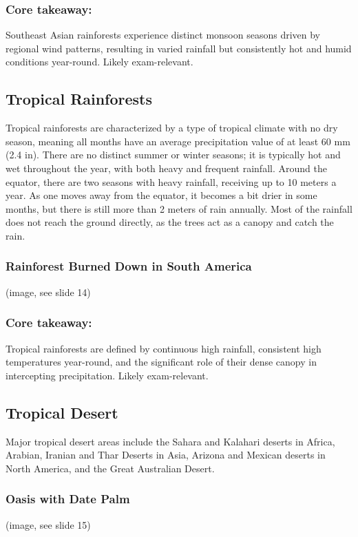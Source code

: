 \subsubsection*{Core takeaway:} 
Southeast Asian rainforests experience distinct monsoon seasons driven by regional wind patterns, resulting in varied rainfall but consistently hot and humid conditions year-round. Likely exam-relevant.


\subsection{Tropical Rainforests} 
Tropical rainforests are characterized by a type of tropical climate with no dry season, meaning all months have an average precipitation value of at least 60 mm (2.4 in). There are no distinct summer or winter seasons; it is typically hot and wet throughout the year, with both heavy and frequent rainfall. Around the equator, there are two seasons with heavy rainfall, receiving up to 10 meters a year. As one moves away from the equator, it becomes a bit drier in some months, but there is still more than 2 meters of rain annually. Most of the rainfall does not reach the ground directly, as the trees act as a canopy and catch the rain. 

\subsubsection*{Rainforest Burned Down in South America} (image, see slide 14)
\subsubsection*{Core takeaway:} 
Tropical rainforests are defined by continuous high rainfall, consistent high temperatures year-round, and the significant role of their dense canopy in intercepting precipitation. Likely exam-relevant.


\subsection{Tropical Desert} Major tropical desert areas include the Sahara and Kalahari deserts in Africa, Arabian, Iranian and Thar Deserts in Asia, Arizona and Mexican deserts in North America, and the Great Australian Desert. 

\subsubsection*{Oasis with Date Palm} (image, see slide 15) 

